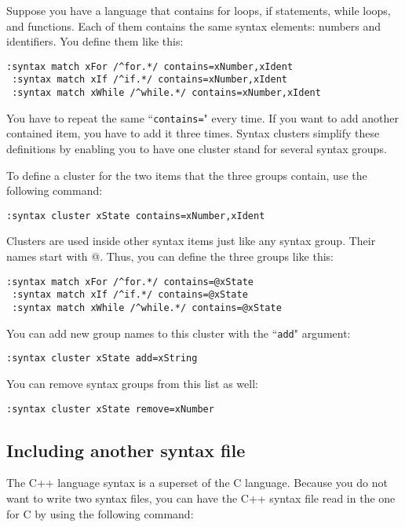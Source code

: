 Suppose you have a language that contains for loops, if statements, while loops, and functions.
Each of them contains the same syntax elements: numbers and identifiers.
You define them like this:

\begin{Verbatim}[samepage=true]
 :syntax match xFor /^for.*/ contains=xNumber,xIdent
 :syntax match xIf /^if.*/ contains=xNumber,xIdent
 :syntax match xWhile /^while.*/ contains=xNumber,xIdent
\end{Verbatim}

You have to repeat the same ``\texttt{contains=}" every time.
If you want to add another contained item, you have to add it three times.
Syntax clusters simplify these definitions by enabling you to have one cluster stand for several syntax groups.

To define a cluster for the two items that the three groups contain, use the following command:

\begin{Verbatim}[samepage=true]
 :syntax cluster xState contains=xNumber,xIdent
\end{Verbatim}

Clusters are used inside other syntax items just like any syntax group.
Their names start with @.
Thus, you can define the three groups like this:

\begin{Verbatim}[samepage=true]
 :syntax match xFor /^for.*/ contains=@xState
 :syntax match xIf /^if.*/ contains=@xState
 :syntax match xWhile /^while.*/ contains=@xState
\end{Verbatim}

You can add new group names to this cluster with the ``\texttt{add}" argument:

\begin{Verbatim}[samepage=true]
 :syntax cluster xState add=xString
\end{Verbatim}

You can remove syntax groups from this list as well:

\begin{Verbatim}[samepage=true]
 :syntax cluster xState remove=xNumber
\end{Verbatim}

\subsection{Including another syntax file}
The C++ language syntax is a superset of the C language.
Because you do not want to write two syntax files, you can have the C++ syntax file read in the one for C by using the following command:

